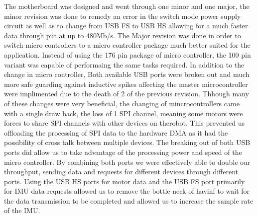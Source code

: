    The motherboard was designed and went through one minor and one major, the minor revision was done to remedy an error in the switch mode power supply circuit as well as to change from USB FS to USB HS allowing for a much faster data  through put at up to 480Mb/s.
 	The Major revision was done in order to switch micro controllers to a micro controller package much better suited for the application. Instead of using the 176 pin package of micro controller, the 100 pin variant was capable of performaing the same tasks required. In addition to the change in micro controller, Both available USB ports were broken out and much more safe guarding against inductive spikes affecting the master microcontroller were implimented due to the death of 2 of the previous revision. Thhough many of these changes were very beneficial, the changing of mincrocontrollers came with a single draw back, the loss of 1 SPI channel, meaning some motors were forces to share SPI channels with other devices on therobot. This prevented us offloading the processing of SPI data to the hardware DMA as it had the possibility of cross talk between multiple devices. The breaking out of both USB ports did allow us to take advantage of the processing power and speed of the micro controller. By combining both ports we were effectively able to double our throughput, sending data and requests for different devices through different ports. Using the USB HS ports for motor data and the USB FS port primarily for IMU data requests allowed us to remove the bottle neck of havinf to wait for the data transmission to be completed and allowed us to increase the sample rate of the IMU.
